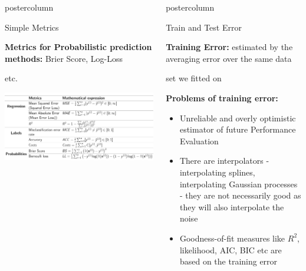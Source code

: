 \documentclass{beamer}
\newlength{\columnheight} %
\begin{document}
\begin{frame}[fragile]{}
\begin{columns}
\begin{column}{.31\textwidth}
\begin{beamercolorbox}[center]{postercolumn}
\begin{minipage}{.98\textwidth}
{\begin{myblock}{Simple Metrics}
						\vspace*{1ex}
						
						\begin{codebox}
						\textbf{Metrics for Probabilistic prediction methods: }Brier Score, Log-Loss 
                        \end{codebox}
                        \begin{codebox}
						etc. \vspace*{1ex}
                        \end{codebox}
                     \includegraphics[width=1.05\columnwidth]{img/table_metric.PNG}
						\vspace*{1ex}
					\end{myblock}\vfill
				}
			\end{minipage}
		\end{beamercolorbox}
	\end{column}
	
	
	\begin{column}{.31\textwidth}
  \begin{beamercolorbox}[center]{postercolumn}
  \begin{minipage}{.98\textwidth}
  \parbox[t][\columnheight]{\textwidth}{
    \begin{myblock}{Train and Test Error}
        \begin{codebox}
    \textbf{Training Error: }estimated by the averaging error over the same data
    \end{codebox}
    \begin{codebox}
    set we fitted on
    \end{codebox}
    \hspace*{1ex}\textbf{Problems of training error: }
    
    \begin{itemize}[$\bullet$]
    \setlength{\itemindent}{+.3in}
    \item Unreliable and overly optimistic estimator of future Performance Evaluation
    \item There are interpolators - interpolating splines, interpolating Gaussian processes - they are not necessarily good as they will also interpolate the noise
    \item Goodness-of-fit measures like $R^2$, likelihood, AIC, BIC etc are based on the training error
    \end{itemize}
    

\end{myblock}}
\end{minipage}
\end{beamercolorbox}
\end{column}
\end{columns}
\end{frame}
\end{document}
